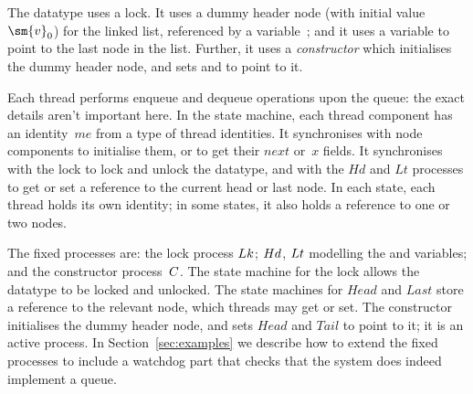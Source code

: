 The datatype uses a lock.  It uses a dummy header node (with initial
value~$\sm{v}_0$) for the linked list, referenced by a variable~;
and it uses a variable  to point to the last node in the list.
Further, it uses a \emph{constructor} which initialises the dummy header node,
and sets  and  to point to it.


Each thread performs enqueue and dequeue operations upon the queue: the
exact details aren't important here.  In the state machine, each thread
component has an identity~$me$ from a type of thread identities.  It
synchronises with node components to initialise them, or to get their $next$
or~$x$ fields.  It synchronises with the lock to lock and unlock the datatype,
and with the $Hd$ and $Lt$ processes  to get or set a reference to the current
head or last node.
In each state, each thread holds its own identity; in some states, it also
holds a reference to one or two nodes.

The fixed processes are: the lock process $Lk$; $Hd$, $Lt$ modelling
the  and  variables; and the constructor
process~$C$.
The state machine for the lock allows the datatype to be locked and unlocked.
The state machines for $Head$ and $Last$ store a reference to the relevant
node, which threads may get or set.  The constructor initialises the dummy
header node, and sets $Head$ and $Tail$ to point to it; it is an active
process.  In Section~\ref{sec:examples} we describe how to extend the fixed
processes to include a watchdog part that checks that the system does indeed
implement a queue.

